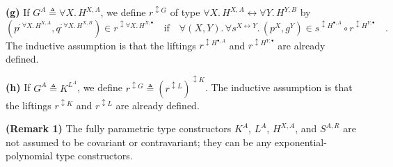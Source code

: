 \textbf{(g)} If $G^{A}\triangleq\forall X.\,H^{X,A}$, we define $r^{\updownarrow G}$
of type $\forall X.\,H^{X,A}\leftrightarrow\forall Y.\,H^{Y,B}$ by
\[
(p^{:\forall X.\,H^{X,A}},q^{:\forall X.\,H^{X,B}})\in r^{\updownarrow\forall X.\,H^{X,\bullet}}\quad\text{if}\quad\forall(X,Y).\,\forall s^{X\leftrightarrow Y}.\,(p^{X},g^{Y})\in s^{\updownarrow H^{\bullet,A}}\circ r^{\updownarrow H^{Y,\bullet}}\quad.
\]
The inductive assumption is that the liftings $r^{\updownarrow H^{\bullet,A}}$
and $r^{\updownarrow H^{Y,\bullet}}$ are already defined.

\textbf{(h)} If $G^{A}\triangleq K^{L^{A}}$, we define $r^{\updownarrow G}\triangleq(r^{\updownarrow L})^{\updownarrow K}$.
The inductive assumption is that the liftings $r^{\updownarrow K}$
and $r^{\updownarrow L}$ are already defined.

\begin{comment}
??? How can we compute $\forall X$ of a boolean value? 
\[
r^{\updownarrow G}\triangleq p^{:\forall X.\,H^{X,A}}\times q^{:\forall Y.\,H^{Y,B}}\rightarrow\forall X.\,(p^{X},q^{X})\in r^{\updownarrow H^{X,\bullet}}\quad.
\]

If $G^{A}\triangleq\forall X.\,H^{X,A}$, we define $r^{\updownarrow G}$
as the function
\[
r^{\updownarrow G}\triangleq p^{:\forall X.\,H^{X,A}}\times q^{:\forall Y.\,H^{Y,B}}\rightarrow\forall X.\,(p^{X},q^{X})\in r^{\updownarrow H^{X,\bullet}}\quad.
\]
Note that $p^{:\forall X.\,H^{X,A}}$ is assumed to satisfy the relational
parametricity property: for any $s^{:X\leftrightarrow Y}$ we have
$(p^{X},p^{Y})\in s^{\updownarrow H^{\bullet,A}}$ and similarly for
$q$. Suppose we have a fully parametric function $\phi:H^{X,A}\times H^{X,B}\rightarrow\bbnum 2$,
and suppose we apply that function only to arguments $p^{X}$ and
$q^{X}$ that are fully parametric. Can we show that $\phi$ is independent
of its type parameter $X$?

Try using a functional relation $r$?

According to Vene\textsf{'}s slides:

For any relation $H^{X,A}\leftrightarrow H^{X,B}$, such as $r^{\updownarrow H^{X,\bullet}}$,
the relation $r^{\updownarrow\forall X.\,H^{X,\bullet}}$ is defined
by:
\[
(p^{:\forall X.\,H^{X,A}},q^{:\forall X.\,H^{X,B}})\in r^{\updownarrow\forall X.\,H^{X,\bullet}}\quad\text{if}\quad(p^{X},g^{Y})\in s^{\updownarrow H^{\bullet,A}}\circ r^{\updownarrow H^{X,\bullet}}???
\]
\end{comment}
\textbf{(Remark 1)} The fully parametric type constructors $K^{A}$,
$L^{A}$, $H^{X,A}$, and $S^{A,R}$ are not assumed to be covariant
or contravariant; they can be any exponential-polynomial type constructors.

